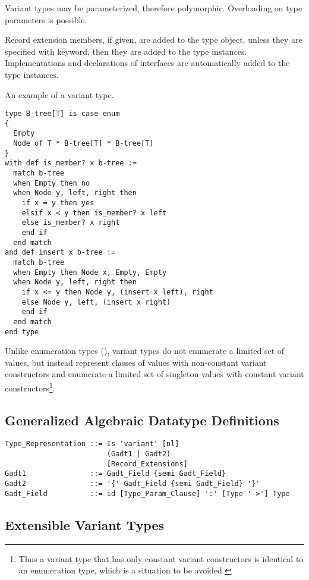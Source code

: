 Variant types may be parameterized, therefore polymorphic. Overloading on type parameters is possible. 

Record extension members, if given, are added to the type object, unless they are specified with  keyword, then they are added to the type instances. Implementations and declarations of interfaces are automatically added to the type instances. 

\example An example of a variant type. 
\begin{lstlisting}
type B-tree[T] is case enum 
{
  Empty
  Node of T * B-tree[T] * B-tree[T]
}
with def is_member? x b-tree :=
  match b-tree
  when Empty then no
  when Node y, left, right then
    if x = y then yes
    elsif x < y then is_member? x left
    else is_member? x right
    end if
  end match
and def insert x b-tree := 
  match b-tree
  when Empty then Node x, Empty, Empty
  when Node y, left, right then
    if x <= y then Node y, (insert x left), right
    else Node y, left, (insert x right)
    end if
  end match
end type
\end{lstlisting}

Unlike enumeration types (), variant types do not enumerate a limited set of values, but instead represent classes of values with non-constant variant constructors and enumerate a limited set of singleton values with constant variant constructors\footnote{Thus a variant type that has only constant variant constructors is identical to an enumeration type, which is a situation to be avoided.}. 





\subsection{Generalized Algebraic Datatype Definitions}
\label{sec:gadt-types}

\syntax\begin{lstlisting}
Type_Representation ::= Is 'variant' [nl]
                        (Gadt1 | Gadt2)
                        [Record_Extensions]
Gadt1               ::= Gadt_Field {semi Gadt_Field}
Gadt2               ::= '{' Gadt_Field {semi Gadt_Field} '}'
Gadt_Field          ::= id [Type_Param_Clause] ':' [Type '->'] Type
\end{lstlisting}





\subsection{Extensible Variant Types}
\label{sec:extensible-variant-types}

